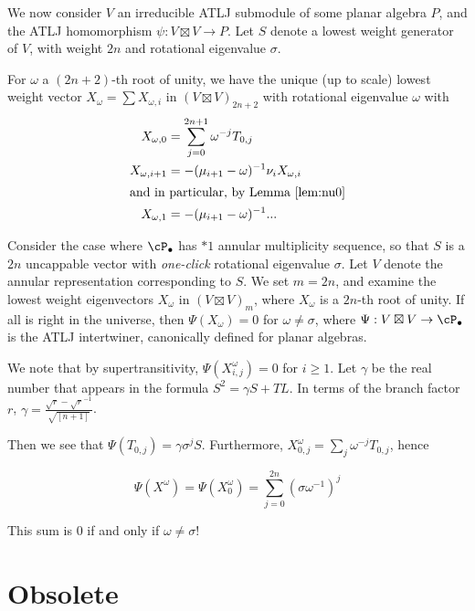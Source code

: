 \documentclass[12pt]{article}
\begin{document}
We now consider $V$ an irreducible ATLJ submodule of some planar algebra $P$, and the ATLJ homomorphism $\psi: V\boxtimes V\rightarrow P$. Let $S$ denote a lowest weight generator of $V$, with weight $2n$ and rotational eigenvalue $\sigma$.

For $\omega$ a $(2n+2)$-th root of unity, we have the unique (up to scale) lowest weight vector $X_\omega = \sum X_{\omega,i}$ in $(V \boxtimes V)_{2n+2}$ with rotational eigenvalue $\omega$ with
\begin{align*}
X_{\omega,0} & = \sum_{j=0}^{2n+1} \omega^{-j} T_{0,j} \\
X_{\omega,i+1} & = - (\mu_{i+1} - \omega)^{-1} \nu_i X_{\omega,i} \\
\intertext{and in particular, by Lemma \ref{lem:nu0}}
X_{\omega,1} & = - (\mu_{i+1} - \omega)^{-1}  ...
\end{align*}

Consider the case where $\cP_\bullet$ has $*1$ annular multiplicity sequence, so that $S$ is a $2n$ uncappable vector with \emph{one-click} rotational eigenvalue $\sigma$. 
Let $V$ denote the annular representation corresponding to $S$. 
We set $m=2n$, and examine the lowest weight eigenvectors $X_{\omega}$ in $(V\boxtimes V)_{m}$, where $X_{\omega}$ is a $2n$-th root of unity.  
If all is right in the universe, then $\Psi(X_{\omega})=0$ for $\omega\neq \sigma$, where $\Psi: V\boxtimes V\rightarrow \cP_\bullet$ is the ATLJ intertwiner, canonically defined for planar algebras.

We note that by supertransitivity, $\Psi(X^{\omega}_{i,j})=0$ for $i\ge 1$. 
Let $\gamma$ be the real number that appears in the formula $S^{2}=\gamma S+TL$. 
In terms of the branch factor $r$, $\gamma=\frac{\sqrt{r}-\sqrt{r}^{-1}}{\sqrt{[n+1]}}$.  

Then we see that $\Psi(T_{0,j})=\gamma \sigma^{j} S$. 
Furthermore, $X^{\omega}_{0,j}=\sum_{j}\omega^{-j} T_{0,j}$, hence

$$\Psi(X^{\omega})=\Psi(X^{\omega}_{0})=\sum^{2n}_{j=0} (\sigma\omega^{-1})^{j}$$

This sum is $0$ if and only if $\omega\ne \sigma$!


\section{Obsolete}
\end{document}
